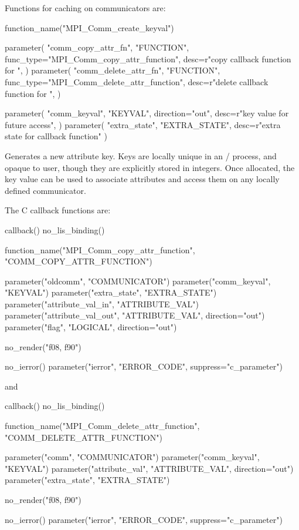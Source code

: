 Functions
for caching on communicators are:

\begin{mpi-binding}
    function_name("MPI_Comm_create_keyval")
    
    parameter(
        "comm_copy_attr_fn",
        "FUNCTION",
        func_type="MPI_Comm_copy_attr_function",
        desc=r"copy callback function for ",
    )
    parameter(
        "comm_delete_attr_fn",
        "FUNCTION",
        func_type="MPI_Comm_delete_attr_function",
        desc=r"delete callback function for ",
    )
    
    parameter(
        "comm_keyval",
        "KEYVAL",
        direction="out",
        desc=r"key value for future access",
    )
    parameter(
        "extra_state", "EXTRA_STATE", desc=r"extra state for callback function"
    )
\end{mpi-binding}

Generates a new attribute key. Keys are locally unique in an \MPI/ process,
and opaque to user, though they are explicitly stored in integers.
Once allocated, the key value can be used to associate attributes
and access them on any locally defined communicator.

\noindent
The C callback functions are:

%
\begin{mpi-binding}
    callback()
    no_lis_binding()
    
    function_name("MPI_Comm_copy_attr_function", "COMM_COPY_ATTR_FUNCTION")
    
    parameter("oldcomm", "COMMUNICATOR")
    parameter("comm_keyval", "KEYVAL")
    parameter("extra_state", "EXTRA_STATE")
    parameter("attribute_val_in", "ATTRIBUTE_VAL")
    parameter("attribute_val_out", "ATTRIBUTE_VAL", direction="out")
    parameter("flag", "LOGICAL", direction="out")
    
    no_render("f08, f90")
    
    no_ierror()
    parameter("ierror", "ERROR_CODE", suppress="c_parameter")
\end{mpi-binding}


\noindent
and

%
\begin{mpi-binding}
    callback()
    no_lis_binding()
    
    function_name("MPI_Comm_delete_attr_function", "COMM_DELETE_ATTR_FUNCTION")
    
    parameter("comm", "COMMUNICATOR")
    parameter("comm_keyval", "KEYVAL")
    parameter("attribute_val", "ATTRIBUTE_VAL", direction="out")
    parameter("extra_state", "EXTRA_STATE")
    
    no_render("f08, f90")
    
    no_ierror()
    parameter("ierror", "ERROR_CODE", suppress="c_parameter")
\end{mpi-binding}

